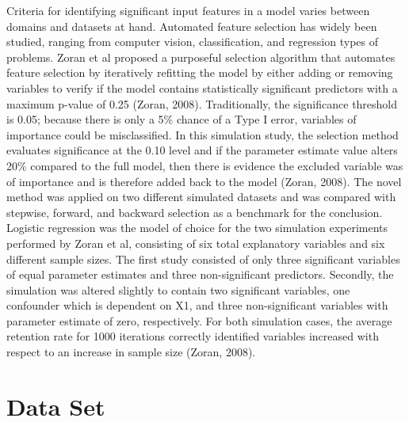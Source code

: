 \documentclass{llncs}
\begin{document}
Criteria for identifying significant input features in a model varies between domains and datasets at hand. Automated feature selection has widely been studied, ranging from computer vision, classification, and regression types of problems. Zoran et al proposed a purposeful selection algorithm that automates feature selection by iteratively refitting the model by either adding or removing variables to verify if the model contains statistically significant predictors with a maximum p-value of 0.25 (Zoran, 2008). Traditionally, the significance threshold is 0.05; because there is only a 5\% chance of a Type I error, variables of importance could be misclassified. In this simulation study, the selection method evaluates significance at the 0.10 level and if the parameter estimate value alters 20\% compared to the full model, then there is evidence the excluded variable was of importance and is therefore added back to the model (Zoran, 2008). The novel method was applied on two different simulated datasets and was compared with stepwise, forward, and backward selection as a benchmark for the conclusion.  Logistic regression was the model of choice for the two simulation experiments performed by Zoran et al, consisting of six total explanatory variables and six different sample sizes. The first study consisted of only three significant variables of equal parameter estimates and three non-significant predictors. Secondly, the simulation was altered slightly to contain two significant variables, one confounder which is dependent on X1, and three non-significant variables with parameter estimate of zero, respectively. For both simulation cases, the average retention rate for 1000 iterations correctly identified variables increased with respect to an increase in sample size (Zoran, 2008).

\section{Data Set}
\end{document}
